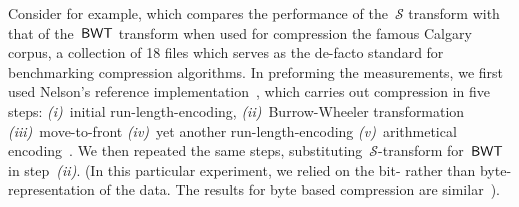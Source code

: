 \documentclass[a4paper,12pt]{article}
\newcommand{\alg}[1]{{\textup{\textsf{#1}}}}
\newcommand{\Acronym}{\ensuremath{\mathcal{S}}}
\newcommand{\BWT}{\alg{BWT}}
\numberwithin{algorithm}{section}
\begin{document}
Consider for example,   which
compares the performance of the~$\Acronym$ transform  with that of the~$\BWT$
transform  when used for compression the famous Calgary corpus, a collection of 18 files which serves as the de-facto standard
  for benchmarking compression algorithms.
In preforming the measurements, we first used Nelson's reference implementation~\cite{Nelson:96}, which carries out
compression in five steps:
\emph{(i)}~initial run-length-encoding,
\emph{(ii)}~Burrow-Wheeler transformation
\emph{(iii)}~move-to-front
\emph{(iv)}~yet another run-length-encoding
\emph{(v)}~arithmetical encoding~\cite{Witten:Neal:Cleary:87}.
We then repeated the same steps, substituting~$\Acronym$-transform
 for~$\BWT$ in step~\emph{(ii)}.
(In this particular experiment, we relied on the bit- rather than byte- representation of the data.
The results for byte based compression are similar~\cite{Nagy:06}).
\end{document}
